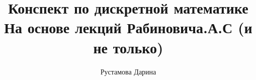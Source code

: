 \documentclass[12pt]{report}
\title{
    Конспект по дискретной математике \\ 
    \large На основе лекций Рабиновича.А.С (и не только)}
\author{
    Рустамова Дарина
}
\date{\the\year}
\begin{document}
\maketitle
\tableofcontents

\newcommand\shortlorem{}

\newpage












\shortlorem
\end{document}
